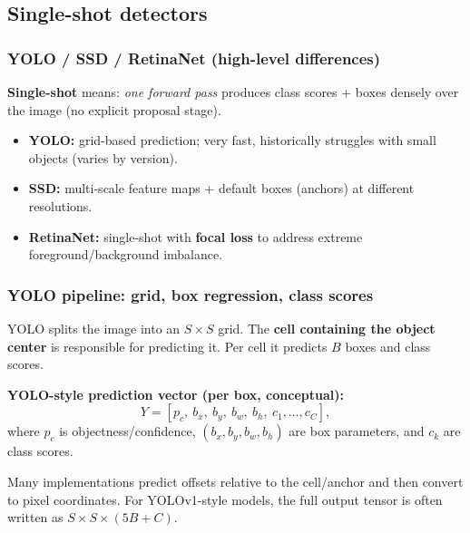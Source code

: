\documentclass[11pt,a4paper]{article}
\begin{document}
\subsection{Single-shot detectors}

\subsubsection{YOLO / SSD / RetinaNet (high-level differences)}

\begin{intbox}
\textbf{Single-shot} means: \emph{one forward pass} produces class scores + boxes densely over the image
(no explicit proposal stage).
\end{intbox}

\begin{itemize}
  \item \textbf{YOLO:} grid-based prediction; very fast, historically struggles with small objects (varies by version).
  \item \textbf{SSD:} multi-scale feature maps + default boxes (anchors) at different resolutions.
  \item \textbf{RetinaNet:} single-shot with \textbf{focal loss} to address extreme foreground/background imbalance.
\end{itemize}

\subsubsection{YOLO pipeline: grid, box regression, class scores}

\begin{defbox}
YOLO splits the image into an $S\times S$ grid. The \textbf{cell containing the object center} is responsible for predicting it.
Per cell it predicts $B$ boxes and class scores.
\end{defbox}

\begin{mathrule}
\textbf{YOLO-style prediction vector (per box, conceptual):}\quad
\[
Y = [p_c,\ b_x,\ b_y,\ b_w,\ b_h,\ c_1,\dots,c_C],
\]
where $p_c$ is objectness/confidence, $(b_x,b_y,b_w,b_h)$ are box parameters, and $c_k$ are class scores.
\end{mathrule}

\begin{notebox}
Many implementations predict offsets relative to the cell/anchor and then convert to pixel coordinates.
For YOLOv1-style models, the full output tensor is often written as $S\times S\times (5B + C)$.
\end{notebox}
\end{document}
